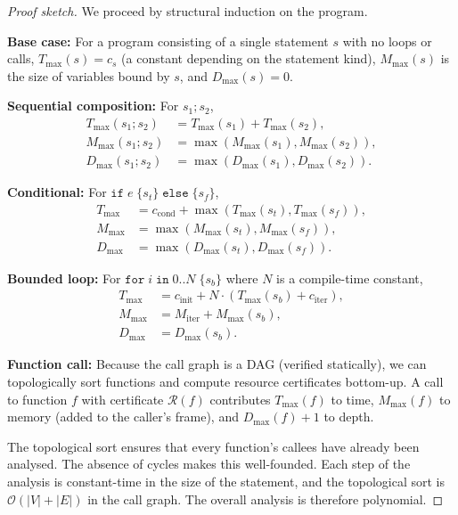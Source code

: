 \documentclass[11pt,a4paper]{article}
\newcommand{\bigO}{\mathcal{O}}
\begin{document}
\begin{proof}[Proof sketch]
We proceed by structural induction on the program.

\textbf{Base case:} For a program consisting of a single statement $s$ with
no loops or calls, $T_{\max}(s) = c_s$ (a constant depending on the
statement kind), $M_{\max}(s)$ is the size of variables bound by $s$, and
$D_{\max}(s) = 0$.

\textbf{Sequential composition:} For $s_1; s_2$,
\begin{align*}
  T_{\max}(s_1; s_2) &= T_{\max}(s_1) + T_{\max}(s_2), \\
  M_{\max}(s_1; s_2) &= \max(M_{\max}(s_1), M_{\max}(s_2)), \\
  D_{\max}(s_1; s_2) &= \max(D_{\max}(s_1), D_{\max}(s_2)).
\end{align*}

\textbf{Conditional:} For $\texttt{if}\;e\;\{s_t\}\;\texttt{else}\;\{s_f\}$,
\begin{align*}
  T_{\max} &= c_{\text{cond}} + \max(T_{\max}(s_t), T_{\max}(s_f)), \\
  M_{\max} &= \max(M_{\max}(s_t), M_{\max}(s_f)), \\
  D_{\max} &= \max(D_{\max}(s_t), D_{\max}(s_f)).
\end{align*}

\textbf{Bounded loop:} For $\texttt{for}\;i\;\texttt{in}\;0\texttt{..}N\;\{s_b\}$
where $N$ is a compile-time constant,
\begin{align*}
  T_{\max} &= c_{\text{init}} + N \cdot (T_{\max}(s_b) + c_{\text{iter}}), \\
  M_{\max} &= M_{\text{iter}} + M_{\max}(s_b), \\
  D_{\max} &= D_{\max}(s_b).
\end{align*}

\textbf{Function call:}  Because the call graph is a DAG (verified
statically), we can topologically sort functions and compute resource
certificates bottom-up.  A call to function $f$ with certificate
$\mathcal{R}(f)$ contributes $T_{\max}(f)$ to time, $M_{\max}(f)$ to
memory (added to the caller's frame), and $D_{\max}(f) + 1$ to depth.

The topological sort ensures that every function's callees have already been
analysed.  The absence of cycles makes this well-founded.  Each step of the
analysis is constant-time in the size of the statement, and the topological
sort is $\bigO(|V| + |E|)$ in the call graph.  The overall analysis is
therefore polynomial.
\end{proof}
\end{document}
